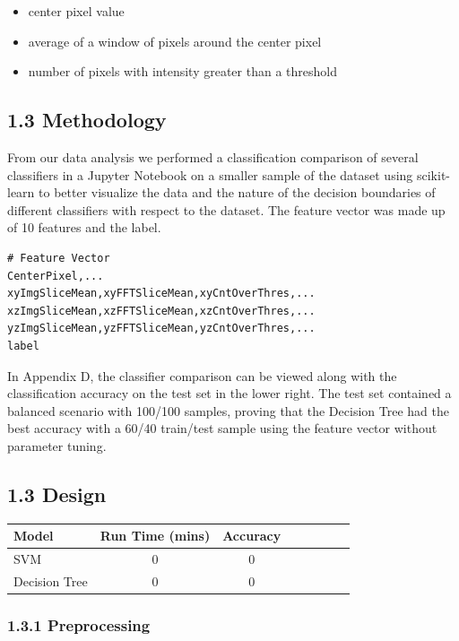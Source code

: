 \documentclass{neu_handout}
\begin{document}
\begin{itemize}
\setlength\itemsep{0.1em}
\item center pixel value
\item average of a window of pixels around the center pixel
\item number of pixels with intensity greater than a threshold
\end{itemize}

\subsection*{1.3 Methodology}

From our data analysis we performed a classification comparison of several classifiers in a Jupyter Notebook on a smaller sample of the dataset using scikit-learn to better visualize the data and the nature of the decision boundaries of different classifiers with respect to the dataset. The feature vector was made up of 10 features and the label.

\begin{lstlisting}
# Feature Vector
CenterPixel,...
xyImgSliceMean,xyFFTSliceMean,xyCntOverThres,...
xzImgSliceMean,xzFFTSliceMean,xzCntOverThres,...
yzImgSliceMean,yzFFTSliceMean,yzCntOverThres,...
label
\end{lstlisting}


In Appendix D, the classifier comparison can be viewed along with the classification accuracy on the test set in the lower right. The test set contained a balanced scenario with 100/100 samples, proving that the Decision Tree had the best accuracy with a 60/40 train/test sample using the feature vector without parameter tuning.


\subsection*{1.3 Design}

\begin{center}
\begin{tabular}{l*{6}{c}r}
Model              & Run Time (mins) & Accuracy \\
\hline
SVM 				& 0 & 0   \\
Decision Tree 		& 0 & 0 \\
\end{tabular}
\end{center}


\subsubsection*{1.3.1 Preprocessing}
\end{document}
